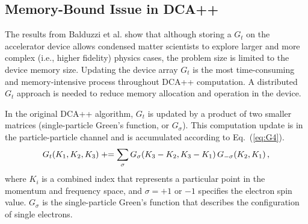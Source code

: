 
\subsection{Memory-Bound Issue in DCA++}
The results from Balduzzi et al. \cite{dca2019} show that although storing a $G_t$ on the accelerator device allows condensed matter scientists
to explore larger and more complex (i.e., higher fidelity) physics
cases, the problem size is limited to the device memory size.
Updating the device array $G_t$ is the most time-consuming and memory-intensive process throughout DCA++ computation. A distributed $G_t$ approach is needed to reduce memory allocation and operation in the device.

In the original DCA++ algorithm, $G_t$ is 
updated by a product of two smaller
matrices (single-particle Green's function, or $G_{\sigma}$). This computation update is 
in the particle-particle channel and is accumulated according to Eq.~(\ref{eq:G4}).
\begin{equation}
\label{eq:G4}
    G_t (K_1, K_2, K_3)  \mathrel{+}= 
      \sum_{\sigma} G_\sigma (K_3 - K_2, K_3 - K_1) \, G_{-\sigma} (K_2, K_1)\,, 
\end{equation}
where $K_i$ is a combined index that represents a particular point in the momentum and frequency space, 
and $\sigma= {+1} \mbox{ or } {-1} $ specifies the electron spin value. $G_{\sigma}$ is the single-particle Green's function that
describes the configuration of single electrons.



